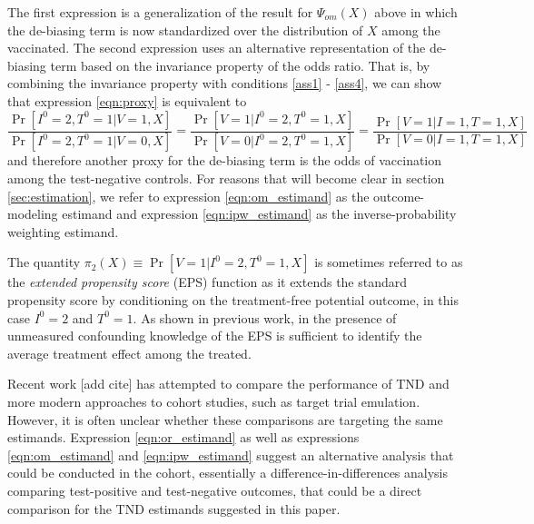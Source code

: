 \documentclass[11pt]{article}
\begin{document}
The first expression is a generalization of the result for $\Psi_{om}(X)$ above in which the de-biasing term is now standardized over the distribution of $X$ among the vaccinated. The second expression uses an alternative representation of the de-biasing term based on the invariance property of the odds ratio. That is, by combining the invariance property with conditions \ref{ass1} - \ref{ass4}, we can show that expression \ref{eqn:proxy} is equivalent to
$$\frac{\Pr[I^0 = 2,  T^0 = 1| V = 1, X]}{\Pr[I^0 = 2,  T^0 = 1 | V = 0, X]} = \frac{\Pr[V = 1 | I^0 = 2, T^0 = 1, X]}{\Pr[V = 0 | I^0 = 2, T^0 = 1, X]} =\frac{\Pr[V = 1 | I = 1, T = 1, X]}{\Pr[V = 0 | I = 1, T = 1, X]}$$
and therefore another proxy for the de-biasing term is the odds of vaccination among the test-negative controls. For reasons that will become clear in section \ref{sec:estimation}, we refer to expression \ref{eqn:om_estimand} as the outcome-modeling estimand and expression \ref{eqn:ipw_estimand} as the inverse-probability weighting estimand.

\begin{remark}
The quantity $\pi_2(X) \equiv \Pr[V = 1 | I^0 = 2, T^0 = 1, X]$ is sometimes referred to as the \textit{extended propensity score} (EPS) function as it extends the standard propensity score by conditioning on the treatment-free potential outcome, in this case $I^0 = 2$ and $T^0 = 1$. As shown in previous work, in the presence of unmeasured confounding knowledge of the EPS is sufficient to identify the average treatment effect among the treated. 
\end{remark}

\begin{remark}
Recent work [add cite] has attempted to compare the performance of TND and more modern approaches to cohort studies, such as target trial emulation. However, it is often unclear whether these comparisons are targeting the same estimands. Expression \ref{eqn:or_estimand} as well as expressions \ref{eqn:om_estimand} and \ref{eqn:ipw_estimand} suggest an alternative analysis that could be conducted in the cohort, essentially a difference-in-differences analysis comparing test-positive and test-negative outcomes, that could be a direct comparison for the TND estimands suggested in this paper. 
\end{remark}
\end{document}
